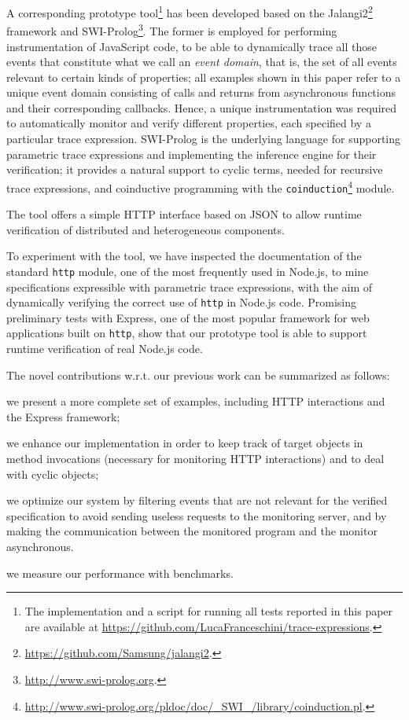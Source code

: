 A corresponding prototype tool\footnote{The implementation and a script for running all tests reported in this paper are available at \url{https://github.com/LucaFranceschini/trace-expressions}.} has been developed based on the Jalangi2\footnote{\url{https://github.com/Samsung/jalangi2}.}
framework and SWI-Prolog\footnote{\url{http://www.swi-prolog.org}.}.
The former is employed for performing instrumentation of JavaScript code, to be able
to dynamically trace all those events that constitute what we call an \emph{event domain}, that is, the set
of all events relevant to certain kinds of properties;
all examples shown in this paper refer to a unique event domain consisting of calls and returns
from asynchronous functions and their corresponding callbacks. Hence, a unique instrumentation
was required to automatically monitor and verify different properties, each specified by a particular trace expression.
SWI-Prolog is the underlying language for supporting parametric
trace expressions and implementing the inference engine for their verification; it provides
a natural support to cyclic terms, needed for recursive trace expressions, and coinductive
programming with the \lstinline{coinduction}\footnote{\url{http://www.swi-prolog.org/pldoc/doc/_SWI_/library/coinduction.pl}.}
module. 

The tool offers a simple HTTP interface based on JSON to allow runtime verification of
distributed and heterogeneous components.

To experiment with the tool, we have inspected the documentation of the standard \lstinline{http} module, one of the most frequently used 
in Node.js, to mine specifications expressible with parametric trace expressions, with the aim of dynamically verifying
the correct use of \lstinline{http} in Node.js code.
Promising preliminary tests with Express, one of the most popular framework for web applications built on \lstinline{http}, show
that our prototype tool is able to support runtime verification of real Node.js code.

The novel contributions w.r.t. our previous work \cite{TowardsIoT17} can be summarized as follows:
\begin{enumerate*}[label=(\alph*)]
	\item we present a more complete set of examples, including HTTP interactions and the Express framework;
	\item we enhance our implementation in order to keep track of target objects in method invocations (necessary for monitoring HTTP interactions) and to deal with cyclic objects;
	\item we optimize our system by filtering events that are not relevant for the verified specification to avoid sending useless requests to the monitoring server, and by making the communication between the monitored program and the monitor asynchronous.
	\item we measure our performance with benchmarks.
\end{enumerate*}

